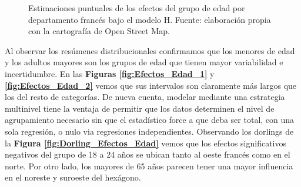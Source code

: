 \begin{figure}
\begin{subfigure}{0.3\textwidth}
	\end{subfigure}
	\caption{Estimaciones puntuales de los efectos del grupo de edad por departamento francés bajo el modelo H. Fuente: elaboración propia con la cartografía de Open Street Map.}
	\label{fig:Mapa_Efectos_Edad}
\end{figure}

Al observar los resúmenes distribucionales confirmamos que los menores de edad y los adultos mayores son los grupos de edad que tienen mayor variabilidad e incertidumbre. En las \textbf{Figuras \ref{fig:Efectos_Edad_1}} y \textbf{\ref{fig:Efectos_Edad_2}} vemos que sus intervalos son claramente más largos que los del resto de categorías. De nueva cuenta, modelar mediante una estrategia multinivel tiene la ventaja de permitir que los datos determinen el nivel de agrupamiento necesario sin que el estadístico force a que deba ser total, con una sola regresión, o nulo via regresiones independientes. Observando los dorlings de la \textbf{Figura \ref{fig:Dorling_Efectos_Edad}} vemos que los efectos significativos negativos del grupo de 18 a 24 años se ubican tanto al oeste francés como en el norte. Por otro lado, los mayores de 65 años parecen tener una mayor influencia en el noreste y suroeste del hexágono.


